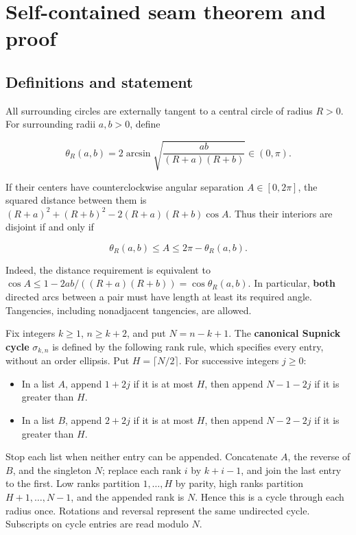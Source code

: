 \section{Self-contained seam theorem and proof}\label{app:seam}
\subsection{Definitions and statement}

All surrounding circles are externally tangent to a central circle of radius
$R>0$. For surrounding radii $a,b>0$, define

\[
 \theta_R(a,b)=2\arcsin\sqrt{\frac{ab}{(R+a)(R+b)}}\in(0,\pi).
 \tag{A.1}\label{eq:seam1}
\]

If their centers have counterclockwise angular separation $A\in[0,2\pi]$,
the squared distance between them is
$(R+a)^2+(R+b)^2-2(R+a)(R+b)\cos A$. Thus their interiors are disjoint
if and only if

\[
 \theta_R(a,b)\le A\le2\pi-\theta_R(a,b).
 \tag{A.2}\label{eq:seam2}
\]

Indeed, the distance requirement is equivalent to
$\cos A\le1-2ab/((R+a)(R+b))=\cos\theta_R(a,b)$. In particular,
\textbf{both} directed arcs between a pair must have length at least its required
angle. Tangencies, including nonadjacent tangencies, are allowed.

Fix integers $k\ge1$, $n\ge k+2$, and put $N=n-k+1$. The
\textbf{canonical Supnick cycle} $\sigma_{k,n}$ is defined by the following
rank rule, which specifies every entry, without an order ellipsis.
Put $H=\lceil N/2\rceil$. For successive integers $j\ge0$:

\begin{itemize}
\item In a list $A$, append $1+2j$ if it is at most $H$, then append
$N-1-2j$ if it is greater than $H$.
\item In a list $B$, append $2+2j$ if it is at most $H$, then append
$N-2-2j$ if it is greater than $H$.
\end{itemize}

Stop each list when neither entry can be appended. Concatenate $A$, the
reverse of $B$, and the singleton $N$; replace each rank $i$ by
$k+i-1$, and join the last entry to the first. Low ranks partition
$1,\ldots,H$ by parity, high ranks partition $H+1,\ldots,N-1$, and
the appended rank is $N$. Hence this is a cycle through each radius once.
Rotations and reversal represent the same undirected cycle.
Subscripts on cycle entries are read modulo $N$.

